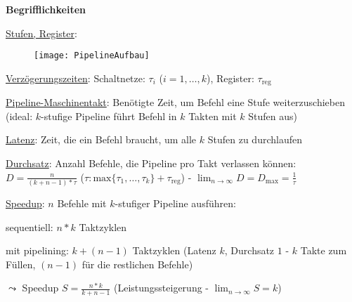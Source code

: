 \textbf{Begrifflichkeiten}
\begin{items}
  \item \underline{Stufen, Register}:
  \begin{figure}[H]
    \centering
    \label{PipelineAufbau}
    \texttt{[image: PipelineAufbau]}
  \end{figure}

  \item \underline{Verzögerungszeiten}: Schaltnetze: $\tau_i$ ($i=1,\dots,k$), Register: $\tau_{\text{reg}}$

  \item \underline{Pipeline-Maschinentakt}: Benötigte Zeit, um Befehl eine Stufe weiterzuschieben (ideal: $k$-stufige Pipeline führt Befehl in $k$ Takten mit $k$ Stufen aus)
  \item \underline{Latenz}: Zeit, die ein Befehl braucht, um alle $k$ Stufen zu durchlaufen
  \item \underline{Durchsatz}: Anzahl Befehle, die Pipeline pro Takt verlassen können: $D=\tfrac{n}{(k+n-1)*\tau}$ ($\tau: \text{max}\{ \tau_1,\dots,\tau_k \} + \tau_\text{reg}$) - $\lim_{n \to \infty} D = D_\text{max} = \tfrac{1}{\tau}$
  \item \underline{Speedup}: $n$ Befehle mit $k$-stufiger Pipeline ausführen:
  \begin{enumeration}
    \item sequentiell: $n*k$ Taktzyklen
    \item mit pipelining: $k+(n-1)$ Taktzyklen (Latenz $k$, Durchsatz $1$ - $k$ Takte zum Füllen, $(n-1)$ für die restlichen Befehle)
  \end{enumeration}
  $\leadsto$ Speedup $S=\tfrac{n*k}{k+n-1}$ (Leistungssteigerung - $\lim_{n \to \infty}S=k$)
\end{items}